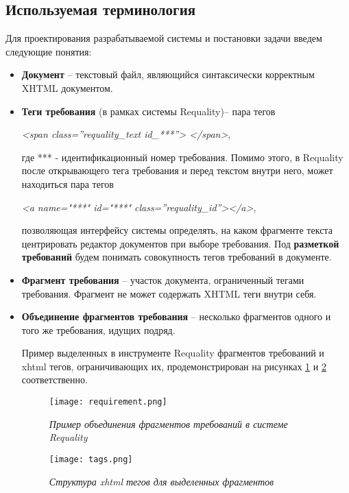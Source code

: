 \subsection{Используемая терминология}
Для проектирования разрабатываемой системы и постановки задачи введем следующие понятия:
\begin{itemize}
\item \textbf{Документ} – текстовый файл, являющийся синтаксически корректным XHTML документом.
\item \textbf{Теги требования} (в рамках системы Requality)– пара тегов

\emph{<span class=”requality\_text id\_***”> 	</span>},

где *** - идентификационный номер требования. Помимо этого, в Requality после открывающего тега требования и перед текстом внутри него, может находиться пара тегов 

\emph{<a name="***" id="***" class=”requality\_id”></a>},

позволяющая интерфейсу системы определять, на каком фрагменте текста центрировать редактор документов при выборе требования. Под \textbf{разметкой требований} будем понимать совокупность тегов требований в документе.

\item \textbf{Фрагмент требования} – участок документа, ограниченный тегами требования. Фрагмент не может содержать XHTML теги внутри себя.

\item \textbf{Объединение фрагментов требования} – несколько фрагментов одного и того же требования, идущих подряд.

Пример выделенных в инструменте Requality фрагментов требований и xhtml тегов, ограничивающих их, продемонстрирован на рисунках \ref{intro:image2} и \ref{intro:image3} соответственно.

\begin{figure}[h]
\begin{center}
\texttt{[image: requirement.png]}
\caption{\emph{Пример объединения фрагментов требований в системе Requality}}
\label{intro:image2}
\end{center}
\end{figure}

\begin{figure}[h]
\begin{center}
\texttt{[image: tags.png]}
\caption{\emph{Структура xhtml тегов для выделенных фрагментов}}
\label{intro:image3}
\end{center}
\end{figure}


\end{itemize}
